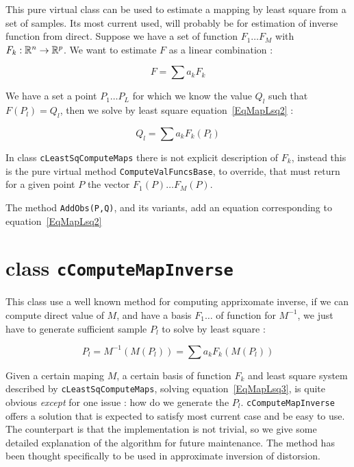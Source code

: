 This pure virtual  class can be used to estimate a mapping by least square from a set of samples.
Its most current used, will probably be for estimation of inverse function from direct.
Suppose we have a set of function  $F_1 \dots F_M$ with  $ F_k : \mathbb{R}^n  \rightarrow  \mathbb{R}^p$.
We want to estimate $F$ as a linear combination :

\begin{equation}
	F = \sum  a_k  F_k \label{EqMapLsq1}
\end{equation}

We have a set a point $P_1 \dots P_L $ for which we know  the value $Q_l$ such
that $F(P_l) = Q_l$,  then we solve by least square equation~\ref{EqMapLsq2} :

\begin{equation}
	Q_l = \sum  a_k  F_k(P_l)  \label{EqMapLsq2}
\end{equation}

In class  {\tt cLeastSqComputeMaps} there is not explicit description of $F_k$,
instead this is the pure virtual method {\tt ComputeValFuncsBase}, to override,
that must return for a given point $P$ the vector $F_1(P) \dots F_M(P)$.

The method {\tt AddObs(P,Q)}, and its variants, add an equation corresponding to 
equation~\ref{EqMapLsq2}

\section{class {\tt cComputeMapInverse}}

\label{CompMapInv}

This class use a well known method for computing apprixomate inverse, if
we can compute direct value of $M$, and have a basis $F_1 \dots $
of function for $M^{-1}$, we just have to generate sufficient sample $P_l$
to solve by least square :


\begin{equation}
	P_l =  M^{-1}(M(P_l)) = \sum  a_k  F_k(M(P_l))  \label{EqMapLsq3}
\end{equation}
 
Given a certain maping $M$, a certain basis of function $F_k$ and least square system
described by {\tt cLeastSqComputeMaps}, solving equation~\ref{EqMapLsq3}, is
quite obvious \emph{except} for one issue : how do we generate the $P_l$.
{\tt cComputeMapInverse} offers a solution that is expected to  satisfy most
current case and be easy to use.  The counterpart is that the implementation
is not trivial, so we give some detailed explanation of the algorithm for future maintenance.
The method has been thought specifically to be used in approximate inversion of distorsion.

